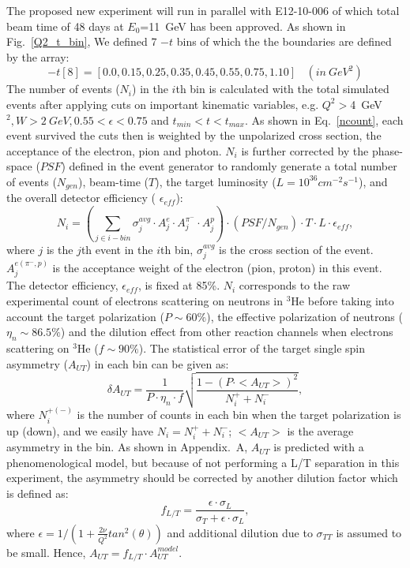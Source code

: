 The proposed new experiment will run in parallel with E12-10-006 of which total
beam time of 48 days at $E_{0}$=11~GeV has been approved.  As shown in
Fig.~\ref{Q2_t_bin}, We defined 7 $-t$ bins of which the the boundaries are
defined by the array:
 \begin{equation}
     -t[8] = [0.0, 0.15, 0.25, 0.35, 0.45, 0.55, 0.75, 1.10]~~~~(in~GeV^{2})
 \end{equation}
The number of events ($N_{i}$) in the $i$th bin is calculated with the total
simulated events after applying cuts on important kinematic variables,
e.g. $Q^{2}>$4~GeV$^{2}, W>2~GeV, 0.55<\epsilon<0.75$ and $t_{min}<t<t_{max}$. As
shown in Eq.~\ref{ncount}, each event survived the cuts then is weighted by the
unpolarized cross section, the acceptance of the electron, pion and
photon. $N_{i}$ is further corrected by the phase-space ($PSF$) defined in the
event generator to randomly generate a total number of events ($N_{gen}$),
beam-time ($T$), the target luminosity ($L=10^{36} cm^{-2}s^{-1}$), and the
overall detector efficiency ( $\epsilon_{eff}$):
 \begin{equation}
     N_{i} = (\sum_{j\in i-bin} \sigma^{avg}_{j}\cdot A^{e}_{j} \cdot
     A^{\pi^{-}}_{j} \cdot A^{p}_{j}) \cdot (PSF/N_{gen}) \cdot T \cdot L \cdot
     \epsilon_{eff},
     \label{ncount}
 \end{equation}
where $j$ is the $j$th event in the $i$th bin, $\sigma^{avg}_{j}$ is the cross
section of the event. $A^{e(\pi^{-},p)}_{j}$ is the acceptance weight of the
electron (pion, proton) in this event. The detector efficiency,
$\epsilon_{eff}$, is fixed at 85\%. $N_{i}$ corresponds to the raw
experimental count of electrons scattering on neutrons in $\mathrm{^{3}He}$
before taking into account the target polarization ($P\sim60\%$), the
effective polarization of neutrons ($\eta_{n}\sim86.5\%$) and the dilution
effect from other reaction channels when electrons scattering on
$\mathrm{^{3}He}$ ($f \sim 90\%$). The statistical error of the target single
spin asymmetry ($A_{UT}$) in each bin can be given as:
  \begin{equation}
    \delta A_{UT} = \frac{1}{P\cdot\eta_{n}\cdot f} \sqrt{\frac{1-(P\cdot
        <A_{UT}>)^{2}}{N^{+}_{i}+N^{-}_{i}}},
    \label{stat_err}
 \end{equation}
where $N^{+(-)}_{i}$ is the number of counts in each bin when the target
polarization is up (down), and we easily have $N_{i}=N^{+}_{i}+N^{-}_{i}$;
$<A_{UT}>$ is the average asymmetry in the bin. As shown in Appendix.~A,
$A_{UT}$ is predicted with a phenomenological model, but because of not
performing a L/T separation in this experiment, the asymmetry should be
corrected by another dilution factor which is defined as:
\begin{equation}
  f_{L/T} =\frac{\epsilon\cdot\sigma_{L} }{\sigma_{T}+\epsilon\cdot\sigma_{L} },
\end{equation} 
where $\epsilon=1/(1+\frac{2\nu}{Q^{2}}tan^{2}(\theta))$
and additional dilution due to $\sigma_{TT}$ is assumed to be small. 
Hence, $A_{UT} = f_{L/T}\cdot A_{UT}^{model}$.

